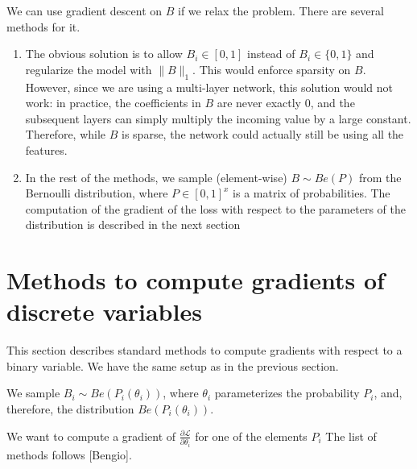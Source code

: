 \documentclass[a4paper,11pt,oneside]{report}
\begin{document}
We can use gradient descent on $B$ if we relax the problem. There are several methods for it.
\begin{enumerate}
    \item The obvious solution is to allow $B_i\in[0,1]$ instead of $B_i\in\{0,1\}$ and regularize the model with $\|B\|_1$. This would enforce sparsity on $B$. However, since we are using a multi-layer network, this solution would not work: in practice, the coefficients in $B$ are never exactly $0$, and the subsequent layers can simply multiply the incoming value by a large constant. Therefore, while $B$ is sparse, the network could actually still be using all the features.
    \item In the rest of the methods, we sample (element-wise) $B\sim Be(P)$ from the Bernoulli distribution, where $P\in[0,1]^x$ is a matrix of probabilities. The computation of the gradient of the loss with respect to the parameters of the distribution is described in the next section
\end{enumerate}

\section{Methods to compute gradients of discrete variables}
\label{sec:grad_discrete}
This section describes standard methods to compute gradients with respect to a binary variable. We have the same setup as in the previous section.

We sample $B_i\sim Be(P_i(\theta_i))$, where $\theta_i$ parameterizes the probability $P_i$, and, therefore, the distribution $Be(P_i(\theta_i))$.

We want to compute a gradient of $\frac{\partial \mathcal L}{\partial \theta_i}$ for one of the elements $P_i$ The list of methods follows [Bengio].
\end{document}
